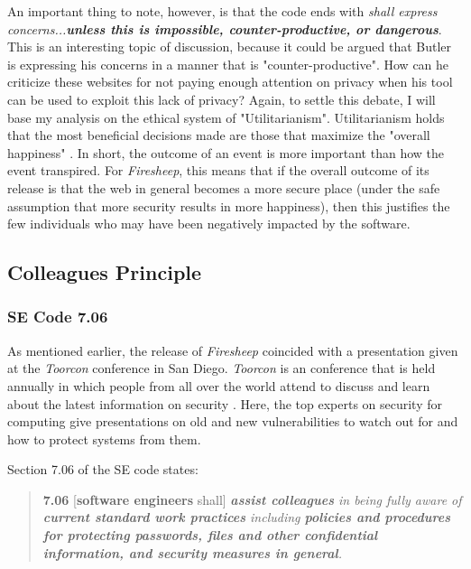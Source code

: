 \documentclass[11pt]{article}
\begin{document}
\begin{multicols}{2}
An important thing to note, however, is that the code ends with \emph{shall express concerns...\textbf{unless this is impossible, counter-productive, or dangerous}}. This is an interesting topic of discussion, because it could be argued that Butler is expressing his concerns in a manner that is "counter-productive". How can he criticize these websites for not paying enough attention on privacy when his tool can be used to exploit this lack of privacy? Again, to settle this debate, I will base my analysis on the ethical system of "Utilitarianism". Utilitarianism holds that the most beneficial decisions made are those that maximize the "overall happiness" \cite{utility}. In short, the outcome of an event is more important than how the event transpired. For \emph{Firesheep}, this means that if the overall outcome of its release is that the web in general becomes a more secure place (under the safe assumption that more security results in more happiness), then this justifies the few individuals who may have been negatively impacted by the software.

\subsection{Colleagues Principle}
\subsubsection{SE Code 7.06}
As mentioned earlier, the release of \emph{Firesheep} coincided with a presentation given at the \emph{Toorcon} conference in San Diego. \emph{Toorcon} is an conference that is held annually in which people from all over the world attend to discuss and learn about the latest information on security \cite{toorcon}. Here, the top experts on security for computing give presentations on old and new vulnerabilities to watch out for and how to protect systems from them.

Section 7.06 of the SE code states:

\begin{quote}
  \textbf{7.06} [\textbf{software engineers} shall] \emph{\textbf{assist colleagues} in being fully aware of \textbf{current standard work practices} including \textbf{policies and procedures for protecting passwords, files and other confidential information, and security measures in general}.} \cite{se_code}
\end{quote}


\end{multicols}
\end{document}
